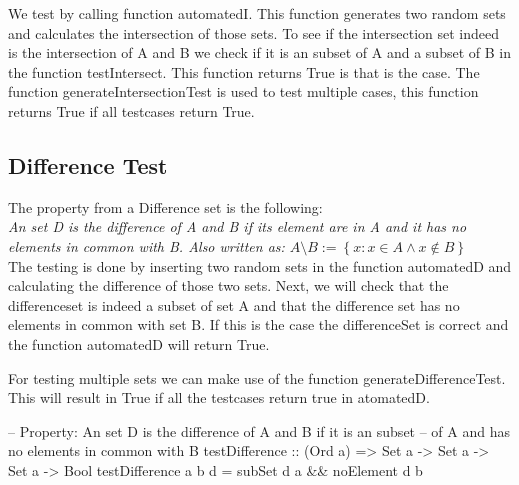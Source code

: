\documentclass{article}
\begin{document}
{We test by calling function automatedI. This function generates two random sets and calculates the intersection of those sets. To see if the intersection set indeed is the intersection of A and B we check if it is an subset of A and a subset of B in the function testIntersect. This function returns True is that is the case. The function generateIntersectionTest is used to test multiple cases, this function returns True if all testcases return True.


\subsection*{Difference Test}
The property from a Difference set is the following:\\
 \emph{
An set D is the difference of A and B if its element are in A and it has no elements in common with B. Also written as:
$ A \setminus B := \left\{ x: x \in A \land x \not \in B\right\} $ }\\

The testing is done by inserting two random sets in the function automatedD and calculating the difference of those two sets. Next, we will check that the differenceset is indeed a subset of set A and that the difference set has no elements in common with set B. If this is the case the differenceSet is correct and the function automatedD will return True. 

For testing multiple sets we can make use of the function generateDifferenceTest. This will result in True if all the testcases return true in atomatedD.

\begin{code}
-- Property: An set D is the difference of A and B if it is an subset
--  of A and has no elements in common with B                        
testDifference :: (Ord a) => Set a -> Set a -> Set a -> Bool
testDifference a b d = subSet d a && noElement d b


\end{code}}
\end{document}
